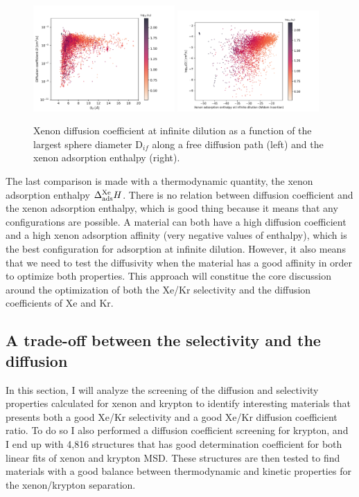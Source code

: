 \documentclass[main]{subfiles}
\begin{document}
\begin{figure}[ht]
  \centering
    \includegraphics[width=0.48\textwidth]{figures/5-diffusion/D_log-lcd_s_+.pdf}
    \includegraphics[width=0.48\textwidth]{figures/5-diffusion/D_log-H_Xe_s_+.pdf}
    \caption{Xenon diffusion coefficient at infinite dilution as a function of the largest sphere diameter D$_{if}$ along a free diffusion path (left) and the xenon adsorption enthalpy (right). }\label{fgr:diff_H_lcd}
\end{figure}

The last comparison is made with a thermodynamic quantity, the xenon adsorption enthalpy $\Delta_{\text{ads}}^{\text{Xe}}H$. There is no relation between diffusion coefficient and the xenon adsorption enthalpy, which is good thing because it means that any configurations are possible. A material can both have a high diffusion coefficient and a high xenon adsorption affinity (very negative values of enthalpy), which is the best configuration for adsorption at infinite dilution. However, it also means that we need to test the diffusivity when the material has a good affinity in order to optimize both properties. This approach will constitue the core discussion around the optimization of both the Xe/Kr selectivity and the diffusion coefficients of Xe and Kr.  

\subsection{A trade-off between the selectivity and the diffusion}

In this section, I will analyze the screening of the diffusion and selectivity properties calculated for xenon and krypton to identify interesting materials that presents both a good Xe/Kr selectivity and a good Xe/Kr diffusion coefficient ratio. To do so I also performed a diffusion coefficient screening for krypton, and I end up with 4,816 structures that has good determination coefficient for both linear fits of xenon and krypton MSD. These structures are then tested to find materials with a good balance between thermodynamic and kinetic properties for the xenon/krypton separation.
\end{document}
